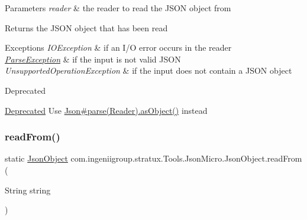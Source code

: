 \begin{DoxyParams}{Parameters}
{\em reader} & the reader to read the J\+S\+ON object from \\
\hline
\end{DoxyParams}
\begin{DoxyReturn}{Returns}
the J\+S\+ON object that has been read 
\end{DoxyReturn}

\begin{DoxyExceptions}{Exceptions}
{\em I\+O\+Exception} & if an I/O error occurs in the reader \\
\hline
{\em \hyperlink{classcom_1_1ingeniigroup_1_1stratux_1_1_tools_1_1_json_micro_1_1_parse_exception}{Parse\+Exception}} & if the input is not valid J\+S\+ON \\
\hline
{\em Unsupported\+Operation\+Exception} & if the input does not contain a J\+S\+ON object \\
\hline
\end{DoxyExceptions}
\begin{DoxyRefDesc}{Deprecated}
\item[\hyperlink{deprecated__deprecated000003}{Deprecated}]Use \hyperlink{classcom_1_1ingeniigroup_1_1stratux_1_1_tools_1_1_json_micro_1_1_json_a74a0f7ea199004578d58033d765481bb}{Json\#parse(\+Reader)}\hyperlink{classcom_1_1ingeniigroup_1_1stratux_1_1_tools_1_1_json_micro_1_1_json_value_a9b02091d2364f0e74a94ed5a6454ef9b}{.as\+Object()} instead \end{DoxyRefDesc}
\mbox{\label{classcom_1_1ingeniigroup_1_1stratux_1_1_tools_1_1_json_micro_1_1_json_object_a613f0a64c66a7d0a5e5f6705fef9afc4}} 
\subsubsection{\texorpdfstring{read\+From()}{readFrom()}\hspace{0.1cm}{\footnotesize\ttfamily [2/2]}}
{\footnotesize\ttfamily static \hyperlink{classcom_1_1ingeniigroup_1_1stratux_1_1_tools_1_1_json_micro_1_1_json_object}{Json\+Object} com.\+ingeniigroup.\+stratux.\+Tools.\+Json\+Micro.\+Json\+Object.\+read\+From (\begin{DoxyParamCaption}\item[{String}]{string }\end{DoxyParamCaption})\hspace{0.3cm}{\ttfamily [static]}}

